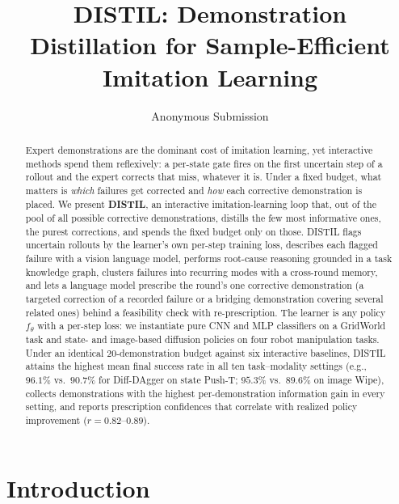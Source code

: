 \documentclass[letterpaper]{article} %
\title{DISTIL: Demonstration Distillation for Sample-Efficient Imitation Learning}
\author{
    Anonymous Submission
}
\begin{document}
\maketitle

\begin{abstract}
Expert demonstrations are the dominant cost of imitation learning, yet
interactive methods spend them reflexively: a per-state gate fires on the first
uncertain step of a rollout and the expert corrects that miss, whatever it is.
Under a fixed budget, what matters is \emph{which} failures get corrected and
\emph{how} each corrective demonstration is placed.
We present \textbf{DISTIL}, an interactive imitation-learning loop that, out
of the pool of all possible corrective demonstrations, distills the few most
informative ones, the purest corrections, and spends the fixed budget only
on those.
DISTIL flags uncertain rollouts by the learner's own per-step training loss,
describes each flagged failure with a vision language model, performs
root-cause reasoning grounded in a
task knowledge graph, clusters failures into recurring modes with a
cross-round memory, and lets a language model prescribe the round's one
corrective demonstration (a targeted correction of a recorded failure or a
bridging demonstration covering several related ones) behind a feasibility
check with re-prescription. The learner is any policy
$f_\theta$ with a per-step loss: we instantiate pure CNN and MLP classifiers on
a GridWorld task and state- and image-based diffusion policies on four robot
manipulation tasks. Under an identical 20-demonstration budget against six
interactive baselines, DISTIL attains the highest mean final success rate in
all ten task--modality settings (e.g., $96.1\%$ vs.\ $90.7\%$ for Diff-DAgger on
state Push-T; $95.3\%$ vs.\ $89.6\%$ on image Wipe), collects demonstrations
with the highest per-demonstration information gain in every setting, and
reports prescription confidences that correlate with realized policy
improvement ($r=0.82$--$0.89$).
\end{abstract}

\section{Introduction}
\end{document}

